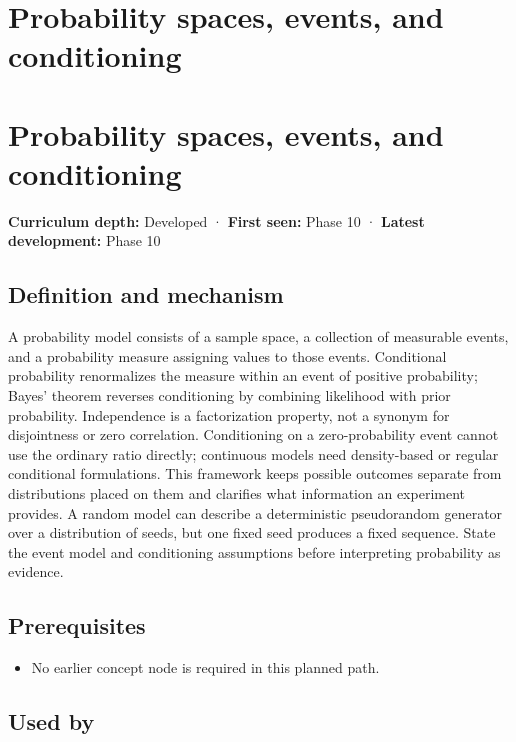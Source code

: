 \hypertarget{appendix-f1ef323f6ed7}{}
\section*{Probability spaces, events, and conditioning}
\section{Probability spaces, events, and conditioning}\label{probability-spaces-events-and-conditioning}

\textbf{Curriculum depth:} Developed · \textbf{First seen:} Phase 10 · \textbf{Latest development:} Phase 10

\subsection{Definition and mechanism}\label{definition-and-mechanism}

A probability model consists of a sample space, a collection of measurable events, and a probability measure assigning values to those events. Conditional probability renormalizes the measure within an event of positive probability; Bayes' theorem reverses conditioning by combining likelihood with prior probability. Independence is a factorization property, not a synonym for disjointness or zero correlation. Conditioning on a zero-probability event cannot use the ordinary ratio directly; continuous models need density-based or regular conditional formulations. This framework keeps possible outcomes separate from distributions placed on them and clarifies what information an experiment provides. A random model can describe a deterministic pseudorandom generator over a distribution of seeds, but one fixed seed produces a fixed sequence. State the event model and conditioning assumptions before interpreting probability as evidence.

\subsection{Prerequisites}\label{prerequisites}

\begin{itemize}
\tightlist
\item
  No earlier concept node is required in this planned path.
\end{itemize}

\subsection{Used by}\label{used-by}

